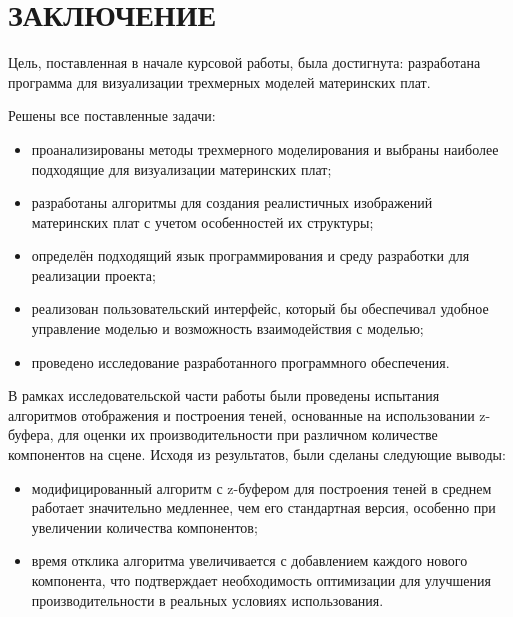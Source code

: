 \chapter*{ЗАКЛЮЧЕНИЕ}

Цель, поставленная в начале курсовой работы, была достигнута: разработана программа для визуализации трехмерных моделей материнских плат.

Решены все поставленные задачи:
\begin{itemize}[label=---]
	\item проанализированы методы трехмерного моделирования и выбраны наиболее подходящие для визуализации материнских плат;
	\item разработаны алгоритмы для создания реалистичных изображений материнских плат с учетом особенностей их структуры;
	\item определён подходящий язык программирования и среду разработки для реализации проекта;
	\item реализован пользовательский интерфейс, который бы обеспечивал удобное управление моделью и возможность взаимодействия с моделью;
	\item проведено исследование разработанного программного обеспечения.
\end{itemize}

В рамках исследовательской части работы были проведены испытания алгоритмов отображения и построения теней, основанные на использовании z-буфера, для оценки их производительности при различном количестве компонентов на сцене. Исходя из результатов, были сделаны следующие выводы:
\begin{itemize}[label=---]
	\item модифицированный алгоритм с z-буфером для построения теней в среднем работает значительно медленнее, чем его стандартная версия, особенно при увеличении количества компонентов;
	\item время отклика алгоритма увеличивается с добавлением каждого нового компонента, что подтверждает необходимость оптимизации для улучшения производительности в реальных условиях использования.
\end{itemize}
